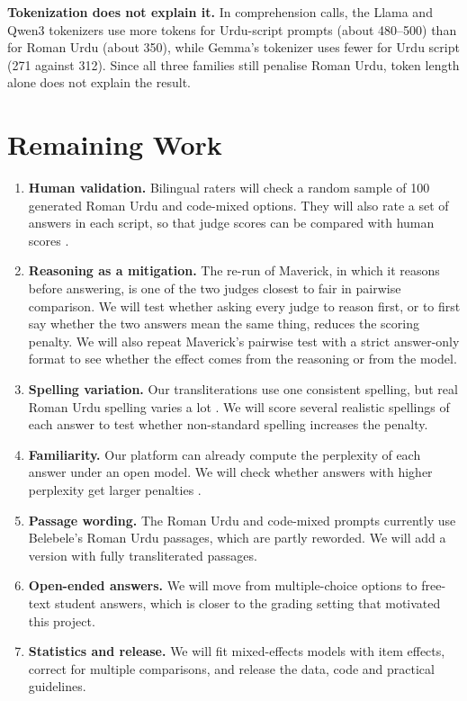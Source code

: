 \documentclass[conference]{IEEEtran}
\begin{document}
\textbf{Tokenization does not explain it.} In comprehension calls, the Llama and Qwen3 tokenizers use more tokens for
Urdu-script prompts (about 480--500) than for Roman Urdu (about 350), while Gemma's tokenizer uses fewer for Urdu script
(271 against 312). Since all three families still penalise Roman Urdu, token length alone does not explain the result.

\section{Remaining Work}
\label{sec:remaining}
\begin{enumerate}
\item \textbf{Human validation.} Bilingual raters will check a random sample of 100 generated Roman Urdu and
code-mixed options. They will also rate a set of answers in each script, so that judge scores can be compared with
human scores \cite{hada2024large}.
\item \textbf{Reasoning as a mitigation.} The re-run of Maverick, in which it reasons before answering, is one of the
two judges closest to fair in pairwise comparison. We will test whether asking every judge to reason first, or to first
say whether the two answers mean the same thing, reduces the scoring penalty. We will also repeat Maverick's pairwise
test with a strict answer-only format to see whether the effect comes from the reasoning or from the model.
\item \textbf{Spelling variation.} Our transliterations use one consistent spelling, but real Roman Urdu spelling varies
a lot \cite{khan2022clustering}. We will score several realistic spellings of each answer to test whether non-standard
spelling increases the penalty.
\item \textbf{Familiarity.} Our platform can already compute the perplexity of each answer under an open model. We will
check whether answers with higher perplexity get larger penalties \cite{wataoka2024self}.
\item \textbf{Passage wording.} The Roman Urdu and code-mixed prompts currently use Belebele's Roman Urdu passages,
which are partly reworded. We will add a version with fully transliterated passages.
\item \textbf{Open-ended answers.} We will move from multiple-choice options to free-text student answers, which is
closer to the grading setting that motivated this project.
\item \textbf{Statistics and release.} We will fit mixed-effects models with item effects, correct for multiple
comparisons, and release the data, code and practical guidelines.
\end{enumerate}
\end{document}
